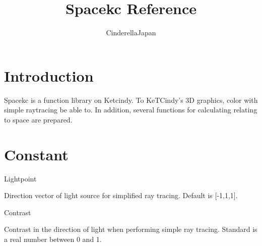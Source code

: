 \documentclass[papersize,a4paper,12pt]{article}
\begin{document}
\title{Spacekc Reference}
\author{CinderellaJapan}
\maketitle

\tableofcontents

\newpage

\section{Introduction }
Spacekc is a function library on Ketcindy. To KeTCindy's 3D graphics, color with simple raytracing
be able to. In addition, several functions for calculating relating to space are prepared.

\section{Constant}

\begin{description}

\hypertarget{lightpoint}{}
\item[Direction vector of light source] Lightpoint
\item[Description] Direction vector of light source for simplified ray tracing.  Default is [-1,1,1].

\vspace{\baselineskip}
\hypertarget{contrast}{}
\item[Contrast] Contrast
\item[Description] Contrast in the direction of light when performing simple ray tracing. Standard is a real number between 0 and 1.

\end{description}

\end{document}
